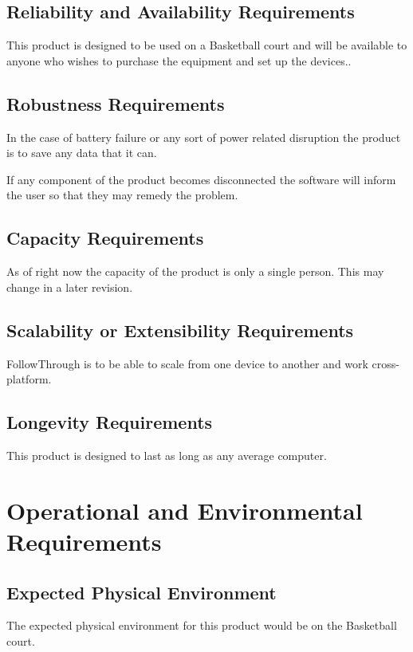 \subsection{Reliability and Availability Requirements}
\hspace*{4mm}This product is designed to be used on a Basketball court and will be available to anyone who wishes to purchase the equipment and set up the devices..

\subsection{Robustness Requirements}
\hspace*{4mm}In the case of battery failure or any sort of power related disruption the product is to save any data that it can.

If any component of the product becomes disconnected the software will inform the user so that they may remedy the problem.
 
\subsection{Capacity Requirements}
\hspace*{4mm}As of right now the capacity of the product is only a single person. This may change in a later revision.
 
\subsection{Scalability or Extensibility Requirements}
\hspace*{4mm}FollowThrough is to be able to scale from one device to another and work cross-platform.
 
\subsection{Longevity Requirements}
\hspace*{4mm}This product is designed to last as long as any average computer.

\section{Operational and Environmental Requirements}
\subsection{Expected Physical Environment}
\hspace*{4mm}The expected physical environment for this product would be on the Basketball court.
 
